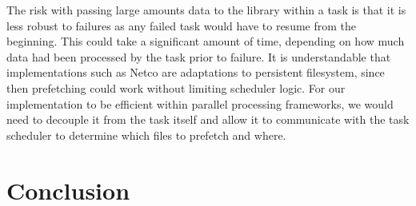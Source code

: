 \documentclass[conference]{IEEEtran}
\begin{document}
The risk with passing large amounts data to the library within a task is that it is less robust to failures as any failed task would have to resume from the beginning. This could
take a significant amount of time, depending on how much data had been processed by the task prior to failure.
It is understandable that implementations such as Netco are adaptations to
persistent filesystem, since then prefetching could work without limiting scheduler logic. For our 
implementation to be efficient within parallel processing frameworks, we would need to decouple it from
the task itself and allow it to communicate with the task scheduler to determine which files to prefetch and
where.



\section{Conclusion}


\end{document}
